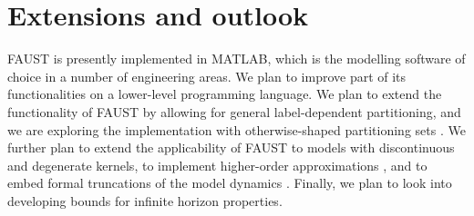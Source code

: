 \documentclass{llncs}
\newcommand{\software}{\textsf{FAUST}\xspace}
\begin{document}
\vspace{-0.15in}
\section{Extensions and outlook}
\label{EI}

\software is presently implemented in MATLAB, 
which is the modelling software of choice in a number of engineering areas. 
We plan to improve part of its functionalities on a lower-level programming language.
We plan to extend the functionality of \software by allowing for general label-dependent partitioning,
and we are exploring the implementation with otherwise-shaped partitioning sets \cite{SA13}.
We further plan to extend the applicability of \software to models with 
discontinuous and degenerate \cite{SA12,SATAC12} kernels, 
to implement higher-order approximations \cite{SAH12}, 
and to embed formal truncations of the model dynamics \cite{SA14}.
Finally, we plan to look into developing bounds for infinite horizon properties.
\end{document}
